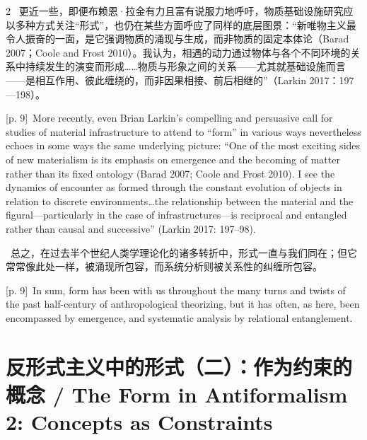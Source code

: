 \documentclass[10pt,a4paper]{article}
\begin{document}
\begin{paracol}{2}
\switchcolumn*
{\scriptsize\color{gray} [p. 9]}\ 更近一些，即便布赖恩·拉金有力且富有说服力地呼吁，物质基础设施研究应以多种方式关注“形式”，也仍在某些方面呼应了同样的底层图景：“新唯物主义最令人振奋的一面，是它强调物质的涌现与生成，而非物质的固定本体论（Barad 2007；Coole and Frost 2010）。我认为，相遇的动力通过物体与各个不同环境的关系中持续发生的演变而形成……物质与形象之间的关系——尤其就基础设施而言——是相互作用、彼此缠绕的，而非因果相接、前后相继的”（Larkin 2017：197—198）。\par
\switchcolumn
{\scriptsize\color{gray} [p. 9]}\ More recently, even Brian Larkin’s compelling and persuasive call for studies of material infrastructure to attend to “form” in various ways nevertheless echoes in some ways the same underlying picture: “One of the most exciting sides of new materialism is its emphasis on emergence and the becoming of matter rather than its fixed ontology (Barad 2007; Coole and Frost 2010). I see the dynamics of encounter as formed through the constant evolution of objects in relation to discrete environments…the relationship between the material and the figural—particularly in the case of infrastructures—is reciprocal and entangled rather than causal and successive” (Larkin 2017: 197–98).\par
\switchcolumn*
{\scriptsize\color{gray} [p. 9]}\ 总之，在过去半个世纪人类学理论化的诸多转折中，形式一直与我们同在；但它常常像此处一样，被涌现所包容，而系统分析则被关系性的纠缠所包容。\par
\switchcolumn
{\scriptsize\color{gray} [p. 9]}\ In sum, form has been with us throughout the many turns and twists of the past half-century of anthropological theorizing, but it has often, as here, been encompassed by emergence, and systematic analysis by relational entanglement.\par
\switchcolumn*
\end{paracol}
\section*{反形式主义中的形式（二）：作为约束的概念 / The Form in Antiformalism 2: Concepts as Constraints}
\end{document}

